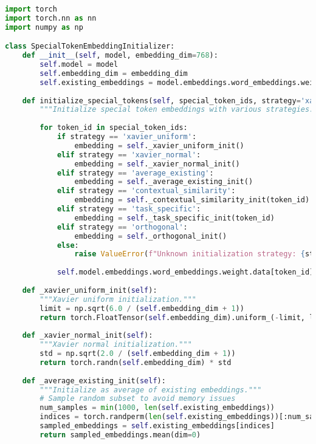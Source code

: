 \begin{lstlisting}[language=Python, caption=Advanced initialization strategies for special token embeddings]
import torch
import torch.nn as nn
import numpy as np

class SpecialTokenEmbeddingInitializer:
    def __init__(self, model, embedding_dim=768):
        self.model = model
        self.embedding_dim = embedding_dim
        self.existing_embeddings = model.embeddings.word_embeddings.weight.data
        
    def initialize_special_tokens(self, special_token_ids, strategy='xavier_uniform'):
        """Initialize special token embeddings with various strategies."""
        
        for token_id in special_token_ids:
            if strategy == 'xavier_uniform':
                embedding = self._xavier_uniform_init()
            elif strategy == 'xavier_normal':
                embedding = self._xavier_normal_init()
            elif strategy == 'average_existing':
                embedding = self._average_existing_init()
            elif strategy == 'contextual_similarity':
                embedding = self._contextual_similarity_init(token_id)
            elif strategy == 'task_specific':
                embedding = self._task_specific_init(token_id)
            elif strategy == 'orthogonal':
                embedding = self._orthogonal_init()
            else:
                raise ValueError(f"Unknown initialization strategy: {strategy}")
                
            self.model.embeddings.word_embeddings.weight.data[token_id] = embedding
            
    def _xavier_uniform_init(self):
        """Xavier uniform initialization."""
        limit = np.sqrt(6.0 / (self.embedding_dim + 1))
        return torch.FloatTensor(self.embedding_dim).uniform_(-limit, limit)
        
    def _xavier_normal_init(self):
        """Xavier normal initialization."""
        std = np.sqrt(2.0 / (self.embedding_dim + 1))
        return torch.randn(self.embedding_dim) * std
        
    def _average_existing_init(self):
        """Initialize as average of existing embeddings."""
        # Sample random subset to avoid memory issues
        num_samples = min(1000, len(self.existing_embeddings))
        indices = torch.randperm(len(self.existing_embeddings))[:num_samples]
        sampled_embeddings = self.existing_embeddings[indices]
        return sampled_embeddings.mean(dim=0)
        

\end{lstlisting}
